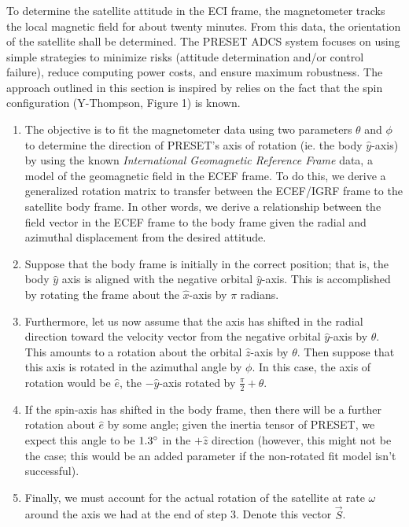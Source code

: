 \documentclass{article}
\begin{document}
\subsubsection{\color{black}{Attitude Determination Technique}}

To determine the satellite attitude in the ECI frame, the magnetometer tracks the local magnetic field for about twenty minutes. From this data, the orientation of the satellite shall be determined. The PRESET ADCS system focuses on using simple strategies to minimize risks (attitude determination and/or control failure), reduce computing power costs, and ensure maximum robustness. The approach outlined in this section is inspired by \cite{tsai} relies on the fact that the spin configuration (Y-Thompson, Figure 1) is known. 

\begin{enumerate}
	\item The objective is to fit the magnetometer data using two parameters $\theta$ and $\phi$ to determine the direction of PRESET's axis of rotation (ie. the body $\hat{y}$-axis) by using the known \textit{International Geomagnetic Reference Frame} data, a model of the geomagnetic field in the ECEF frame. To do this, we derive a generalized rotation matrix to transfer between the ECEF/IGRF frame to the satellite body frame. In other words, we derive a relationship between the field vector in the ECEF frame to the body frame given the radial and azimuthal displacement from the desired attitude.
	\item Suppose that the body frame is initially in the correct position; that is, the body $\hat{y}$ axis is aligned with the negative orbital $\hat{y}$-axis. This is accomplished by rotating the frame about the $\hat{x}$-axis by $\pi$ radians. 
	\item Furthermore, let us now assume that the axis has shifted in the radial direction toward the velocity vector from the negative orbital $\hat{y}$-axis by $\theta$. This amounts to a rotation about the orbital $\hat{z}$-axis by $\theta$. Then suppose that this axis is rotated in the azimuthal angle by $\phi$. In this case, the axis of rotation would be $\hat{e}$, the $-\hat{y}$-axis rotated by $\frac{\pi}{2} + \theta$. 
	\item If the spin-axis has shifted in the body frame, then there will be a further rotation about $\hat{e}$ by some angle; given the inertia tensor of PRESET, we expect this angle to be $1.3 \degree$ in the $+\hat{z}$ direction (however, this might not be the case; this would be an added parameter if the non-rotated fit model isn't successful).
	\item Finally, we must account for the actual rotation of the satellite at rate $\omega$ around the axis we had at the end of step 3. Denote this vector $\vec{S}$. 
\end{enumerate}
\end{document}
